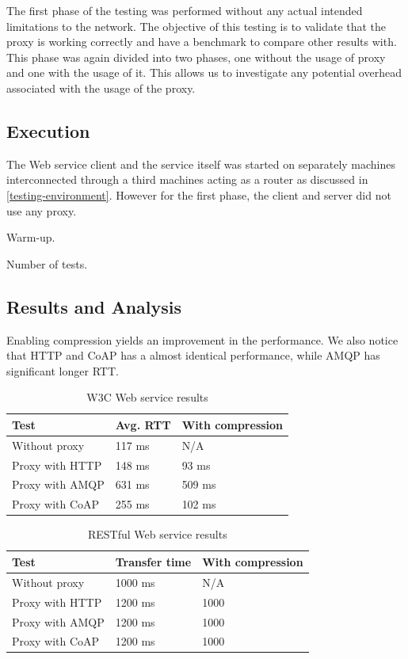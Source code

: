 The first phase of the testing was performed without any actual intended
limitations to the network. The objective of this testing is to validate that
the proxy is working correctly and have a benchmark to compare other results
with. This phase was again divided into two phases, one without the usage of
proxy and one with the usage of it. This allows us to investigate any potential
overhead associated with the usage of the proxy.

\subsection{Execution}

The Web service client and the service itself was started on separately machines
interconnected through a third machines acting as a router as discussed in
\cref{testing-environment}. However for the first phase, the client and server
did not use any proxy.

Warm-up.

Number of tests.



\subsection{Results and Analysis}

Enabling compression yields an improvement in the performance. We also notice
that HTTP and CoAP has a almost identical performance, while AMQP has
significant longer RTT.

\begin{table}[h!]
\begin{tabular}{| l | l | l |}
\hline
  \textbf{Test} & \textbf{Avg. RTT} & \textbf{With compression}\\ \hline
  Without proxy & 117 ms & N/A \\ \hline
  Proxy with HTTP & 148 ms & 93 ms \\ \hline
  Proxy with AMQP & 631 ms & 509 ms \\ \hline
  Proxy with CoAP & 255 ms & 102 ms \\ \hline
\end{tabular}
\caption{W3C Web service results}
\end{table}

\begin{table}[h!]
\begin{tabular}{| l | l | l |}
\hline
  \textbf{Test} & \textbf{Transfer time} & \textbf{With compression}\\ \hline
  Without proxy & 1000 ms & N/A \\ \hline
  Proxy with HTTP & 1200 ms & 1000\\ \hline
  Proxy with AMQP & 1200 ms & 1000\\ \hline
  Proxy with CoAP & 1200 ms & 1000\\ \hline
\end{tabular}
\caption{RESTful Web service results}
\end{table}


